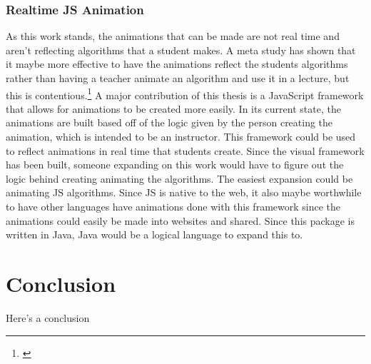 \documentclass[12pt,twoside]{reedthesis}
\begin{document}
\subsection{Realtime JS Animation}
As this work stands, the animations that can be made are not real time and aren't reflecting algorithms that a student makes. A meta study has shown that it maybe more effective to have the animations reflect the students algorithms rather than having a teacher animate an algorithm and use it in a lecture, but this is contentious.\footnote{\cite{hundhausen_meta-study_2002}} A major contribution of this thesis is a JavaScript framework that allows for animations to be created more easily. In its current state, the animations are built based off of the logic given by the person creating the animation, which is intended to be an instructor. This framework could be used to reflect animations in real time that students create. Since the visual framework has been built, someone expanding on this work would have to figure out the logic behind creating animating the algorithms. The easiest expansion could be animating JS algorithms. Since JS is native to the web, it also maybe worthwhile to have other languages have animations done with this framework since the animations could easily be made into websites and shared. Since this package is written in Java, Java would be a logical language to expand this to. 


	
\chapter*{Conclusion}
	\setcounter{chapter}{4}
	\setcounter{section}{0}
	
Here's a conclusion
    \appendix



  \backmatter %

    \nocite{*}


%  
 

\end{document}
